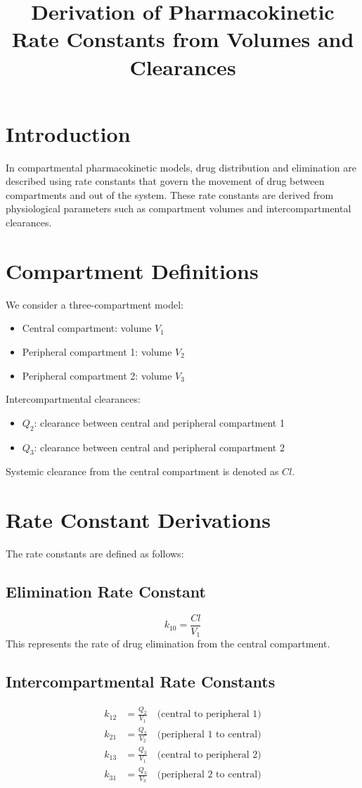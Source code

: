 \documentclass[11pt]{article}
\title{Derivation of Pharmacokinetic Rate Constants from Volumes and Clearances}
\author{}
\date{}
\begin{document}
\maketitle

\section*{Introduction}
In compartmental pharmacokinetic models, drug distribution and elimination are described using rate constants that govern the movement of drug between compartments and out of the system. These rate constants are derived from physiological parameters such as compartment volumes and intercompartmental clearances.

\section*{Compartment Definitions}
We consider a three-compartment model:
\begin{itemize}
    \item Central compartment: volume $V_1$
    \item Peripheral compartment 1: volume $V_2$
    \item Peripheral compartment 2: volume $V_3$
\end{itemize}
Intercompartmental clearances:
\begin{itemize}
    \item $Q_2$: clearance between central and peripheral compartment 1
    \item $Q_3$: clearance between central and peripheral compartment 2
\end{itemize}
Systemic clearance from the central compartment is denoted as $Cl$.

\section*{Rate Constant Derivations}
The rate constants are defined as follows:

\subsection*{Elimination Rate Constant}
\[
k_{10} = \frac{Cl}{V_1}
\]
This represents the rate of drug elimination from the central compartment.

\subsection*{Intercompartmental Rate Constants}
\begin{align*}
k_{12} &= \frac{Q_2}{V_1} \quad \text{(central to peripheral 1)} \\
k_{21} &= \frac{Q_2}{V_2} \quad \text{(peripheral 1 to central)} \\
k_{13} &= \frac{Q_3}{V_1} \quad \text{(central to peripheral 2)} \\
k_{31} &= \frac{Q_3}{V_3} \quad \text{(peripheral 2 to central)}
\end{align*}
\end{document}
